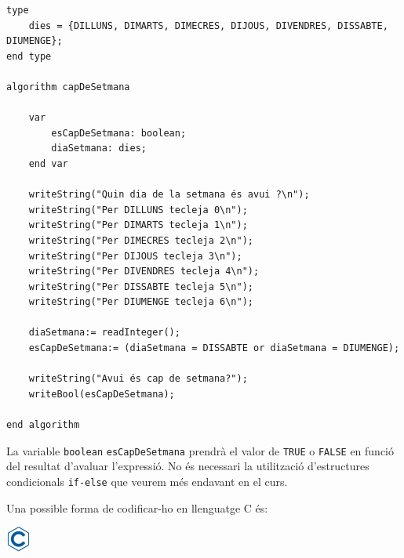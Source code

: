 \documentclass[]{book}
\begin{document}
\begin{verbatim}
type
    dies = {DILLUNS, DIMARTS, DIMECRES, DIJOUS, DIVENDRES, DISSABTE, DIUMENGE};
end type

algorithm capDeSetmana

    var
        esCapDeSetmana: boolean;
        diaSetmana: dies;
    end var

    writeString("Quin dia de la setmana és avui ?\n");
    writeString("Per DILLUNS tecleja 0\n");
    writeString("Per DIMARTS tecleja 1\n");
    writeString("Per DIMECRES tecleja 2\n");
    writeString("Per DIJOUS tecleja 3\n");
    writeString("Per DIVENDRES tecleja 4\n");
    writeString("Per DISSABTE tecleja 5\n");
    writeString("Per DIUMENGE tecleja 6\n");
 
    diaSetmana:= readInteger();
    esCapDeSetmana:= (diaSetmana = DISSABTE or diaSetmana = DIUMENGE);

    writeString("Avui és cap de setmana?");
    writeBool(esCapDeSetmana);

end algorithm
\end{verbatim}

La variable \texttt{boolean} \texttt{esCapDeSetmana} prendrà el valor de
\texttt{TRUE} o \texttt{FALSE} en funció del resultat d'avaluar
l'expressió. No és necessari la utilització d'estructures condicionals
\texttt{if-else} que veurem més endavant en el curs.

Una possible forma de codificar-ho en llenguatge C és:

\includegraphics{./img/c.png}
\end{document}
